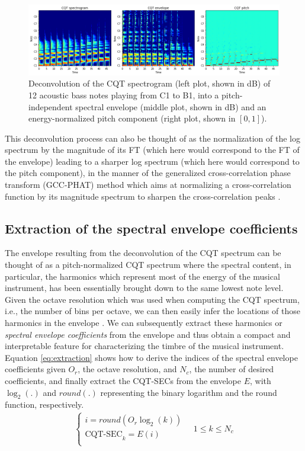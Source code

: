 \documentclass[journal]{IEEEtran}
\begin{document}
\begin{figure}[htp]
    \centering
    \includegraphics[width=\textwidth]{deconvolution.png}
    \caption{Deconvolution of the CQT spectrogram (left plot, shown in dB) of 12 acoustic bass notes playing from C1 to B1, into a pitch-independent spectral envelope (middle plot, shown in dB) and an energy-normalized pitch component (right plot, shown in $[0, 1]$).}
    \label{fig:deconvolution}
\end{figure}

This deconvolution process can also be thought of as the normalization of the log spectrum by the magnitude of its FT (which here would correspond to the FT of the envelope) leading to a sharper log spectrum (which here would correspond to the pitch component), in the manner of the generalized cross-correlation phase transform (GCC-PHAT) method which aims at normalizing a cross-correlation function by its magnitude spectrum to sharpen the cross-correlation peaks \cite{knapp1976}.


\subsection{Extraction of the spectral envelope coefficients}

The envelope resulting from the deconvolution of the CQT spectrum can be thought of as a pitch-normalized CQT spectrum where the spectral content, in particular, the harmonics which represent most of the energy of the musical instrument, has been essentially brought down to the same lowest note level. Given the octave resolution which was used when computing the CQT spectrum, i.e., the number of bins per octave, we can then easily infer the locations of those harmonics in the envelope \cite{brown1991, brown1992}. We can subsequently extract these harmonics or \textit{spectral envelope coefficients} from the envelope and thus obtain a compact and interpretable feature for characterizing the timbre of the musical instrument. Equation \ref{eq:extraction} shows how to derive the indices of the spectral envelope coefficients given $O_r$, the octave resolution, and $N_c$, the number of desired coefficients, and finally extract the CQT-SECs from the envelope $E$, with $\log_2(.)$ and $round(.)$ representing the binary logarithm and the round function, respectively.
\begin{equation}
\label{eq:extraction}
\begin{split}
\begin{cases}
i = round(O_r \log_2(k)) \\
\text{CQT-SEC}_k = E(i) \\
\end{cases}
\quad 1 \le k \le N_c
\end{split}
\end{equation}
\end{document}
